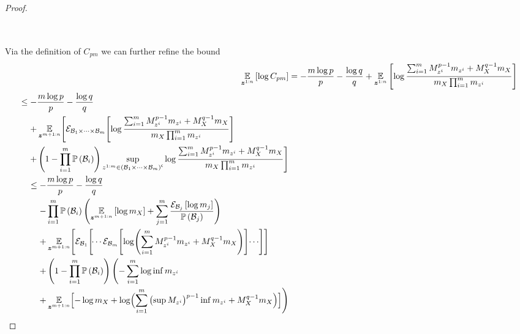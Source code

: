 \begin{proof}
\begin{small}
\begin{align}
\begin{split}
			\end{split}
		\end{align}
	\end{small}
	Via the definition of $C_{pm}$ we can further refine the bound
	\begin{align*}
		\expectation{\log C_{pm}}{\observationRV{}{1:n}} & =-\frac{m\log p}{p}-\frac{\log q}{q}+\expectation{\log\frac{\sum_{i=1}^{m} M_{\observation{}{i}}^{p-1}m_{\observation{}{i}}+M_{\states{}}^{q-1}m_{\states{}}}{m_{\states{}}\prod_{i=1}^{m}m_{\observation{}{i}}}}{\observationRV{}{1:n}}\\
		\begin{split}
			& \leq-\frac{m\log p}{p}-\frac{\log q}{q}\\
			& \phantomeq+\E_{\observationRV{}{m+1:n}}\Biggl[\partexp_{\subSpace_1\times\cdots\times\subSpace_m}\Biggl[
			\log\frac{\sum_{i=1}^{m}M_{\observation{}{i}}^{p-1}m_{\observation{}{i}}+M_{\states{}}^{q-1}m_{\states{}}}{m_{\states{}}\prod_{i=1}^{m}m_{\observation{}{i}}}\Biggr] \\
			&\phantomeq
			+\left(1-\prod_{i=1}^m\measure{\subSpace_i}\right)\sup_{\observation{}{1:m}\in\stcomp{{\left(\subSpace_1\times\cdots\times\subSpace_m\right)}}}
			\log\frac{\sum_{i=1}^{m} M_{\observation{}{i}}^{p-1}m_{\observation{}{i}}+M_{\states{}}^{q-1}m_{\states{}}}{m_{\states{}}\prod_{i=1}^{m}m_{\observation{}{i}}}\Biggr]
		\end{split}\\
		\begin{split}
			& \leq-\frac{m\log p}{p}-\frac{\log q}{q}\\
			& \phantomeq
			-\prod_{i=1}^m\measure{\subSpace_i}\Biggl(\expectation{\log m_{\states{}}}{\observationRV{}{m+1:n}}
			+\sum_{j=1}^m\frac{\partialexpectation{\log m_j}{\subSpace_j}}{\measure{\subSpace_j}}\Biggr)          \\
			& \phantomeq
			+\E_{\observationRV{}{m+1:n}}\Biggl[\partexp_{\subSpace_1}\Biggl[\dotsi\partexp_{\subSpace_m}\Biggl[
			\log \Biggl(\sum_{i=1}^{m} M_{\observation{}{i}}^{p-1}m_{\observation{}{i}}
			+M_{\states{}}^{q-1}m_{\states{}}\Biggr)\Biggr]\dotsi\Biggr]\Biggr]                                   \\
			& \phantomeq
			+\left(1-\prod_{i=1}^m\measure{\subSpace_i}\right)\Biggl(-\sum_{i=1}^m\log \inf m_{\observation{}{i}} \\
			& \phantomeq
			+\E_{\observationRV{}{m+1:n}}\Bigl[-\log m_{\states{}}
			+\log\Bigl(\sum_{i=1}^{m}\left(\sup M_{\observation{}{i}}\right)^{p-1}\inf m_{\observation{}{i}}
			+M_{\states{}}^{q-1}m_{\states{}}\Bigr)\Bigr]\Biggr)
		\end{split}
	\end{align*}
\end{proof}